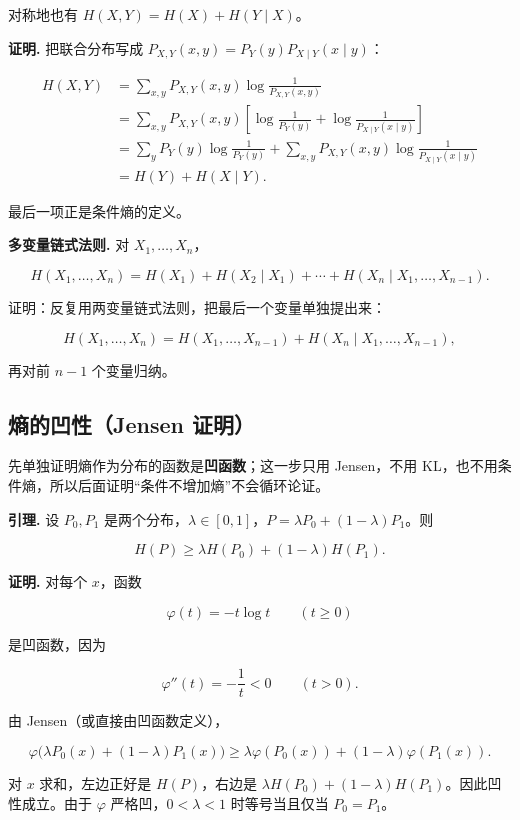 对称地也有 $H(X,Y)=H(X)+H(Y\mid X)$。

\textbf{证明.} 把联合分布写成 $P_{X,Y}(x,y)=P_Y(y)P_{X\mid Y}(x\mid y)$：

\[
\begin{aligned}
H(X,Y)
&=\sum_{x,y}P_{X,Y}(x,y)\log\frac1{P_{X,Y}(x,y)}\\
&=\sum_{x,y}P_{X,Y}(x,y)\left[
\log\frac1{P_Y(y)}+\log\frac1{P_{X\mid Y}(x\mid y)}
\right]\\
&=\sum_yP_Y(y)\log\frac1{P_Y(y)}
+\sum_{x,y}P_{X,Y}(x,y)\log\frac1{P_{X\mid Y}(x\mid y)}\\
&=H(Y)+H(X\mid Y).
\end{aligned}
\]

最后一项正是条件熵的定义。

\textbf{多变量链式法则.} 对 $X_1,\dots,X_n$，

\[
H(X_1,\dots,X_n)
=H(X_1)+H(X_2\mid X_1)+\cdots
+H(X_n\mid X_1,\dots,X_{n-1}).
\]

证明：反复用两变量链式法则，把最后一个变量单独提出来：

\[
H(X_1,\dots,X_n)=H(X_1,\dots,X_{n-1})+H(X_n\mid X_1,\dots,X_{n-1}),
\]

再对前 $n-1$ 个变量归纳。

\subsection{熵的凹性（Jensen 证明）}


先单独证明熵作为分布的函数是\textbf{凹函数}；这一步只用 Jensen，不用 KL，也不用条件熵，所以后面证明“条件不增加熵”不会循环论证。

\textbf{引理.} 设 $P_0,P_1$ 是两个分布，$\lambda\in[0,1]$，$P=\lambda P_0+(1-\lambda)P_1$。则

\[
\boxed{
H(P)\ge\lambda H(P_0)+(1-\lambda)H(P_1)
}.
\]

\textbf{证明.} 对每个 $x$，函数

\[
\varphi(t)=-t\log t\qquad(t\ge0)
\]

是凹函数，因为

\[
\varphi''(t)=-\frac1t<0\qquad(t>0).
\]

由 Jensen（或直接由凹函数定义），

\[
\varphi\bigl(\lambda P_0(x)+(1-\lambda)P_1(x)\bigr)
\ge
\lambda\varphi(P_0(x))+(1-\lambda)\varphi(P_1(x)).
\]

对 $x$ 求和，左边正好是 $H(P)$，右边是 $\lambda H(P_0)+(1-\lambda)H(P_1)$。因此凹性成立。由于 $\varphi$ 严格凹，$0<\lambda<1$ 时等号当且仅当 $P_0=P_1$。

